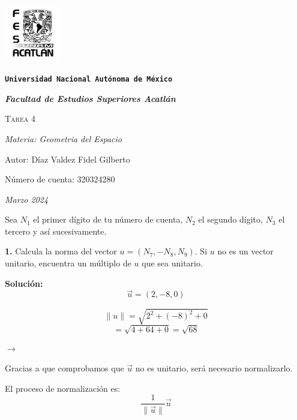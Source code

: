 \documentclass{article}
\begin{document}
\begin{titlepage}
    \centering    
    {\includegraphics[width=2.5cm]{logo.png}\par}
    {\texttt{\bfseries \LARGE Universidad Nacional Autónoma de México} \par}
    \vspace{1cm}
    {\itshape \Large \bfseries Facultad de Estudios Superiores Acatlán \par}
    \vspace{3cm}
    {\scshape \Huge Tarea 4 \par}
    \vspace {3cm}
    {\slshape \Large Materia: Geometria del Espacio \par}
    \vspace{2cm}
    {\Large Autor: Díaz Valdez Fidel Gilberto\par}
    {\Large Número de cuenta: 320324280\par}
    \vfill
    {\itshape Marzo 2024 \par}
\end{titlepage}

Sea $N_1$ el primer dígito de tu número de cuenta, $N_2$ el segundo dígito, $N_3$ el tercero y así
sucesivamente.
\par

\textbf{1.} Calcula la norma del vector $u = (N_7, -N_8, N_9)$. Si $u$ no es un vector unitario, encuentra 
un múltiplo de $u$ que sea unitario.
\par

\textbf{Solución:}
$$\vec{u} = (2, -8, 0)$$
\vspace{10pt}

\begin{minipage}[c]{0.5cm}
    $$\|u\| = \sqrt{2^2+(-8)^2+0}$$
    $$= \sqrt{4+64+0} = \sqrt{68}$$
\end{minipage}\hspace*{4cm}
$\rightarrow$\hspace*{0.5cm}
\begin{minipage}[c]{6cm}
    Gracias a que comprobamos que $\vec{u}$ no es unitario,
    será necesario normalizarlo. 
    \par

    El proceso de normalización es:
    $$\frac{1}{\|\vec{u}\|}\vec{u}$$
\end{minipage}
\vspace{10pt}
\end{document}
